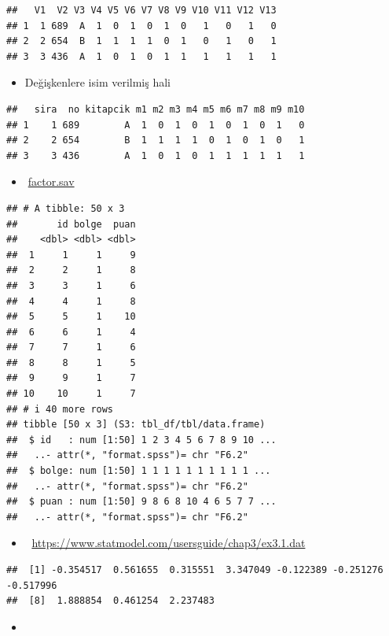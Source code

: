 \documentclass[
  oneside]{book}
\providecommand{\tightlist}{%
  \setlength{\itemsep}{0pt}\setlength{\parskip}{0pt}}
\begin{document}
\begin{verbatim}
##   V1  V2 V3 V4 V5 V6 V7 V8 V9 V10 V11 V12 V13
## 1  1 689  A  1  0  1  0  1  0   1   0   1   0
## 2  2 654  B  1  1  1  1  0  1   0   1   0   1
## 3  3 436  A  1  0  1  0  1  1   1   1   1   1
\end{verbatim}

\begin{itemize}
\tightlist
\item
  Değişkenlere isim verilmiş hali
\end{itemize}

\begin{verbatim}
##   sira  no kitapcik m1 m2 m3 m4 m5 m6 m7 m8 m9 m10
## 1    1 689        A  1  0  1  0  1  0  1  0  1   0
## 2    2 654        B  1  1  1  1  0  1  0  1  0   1
## 3    3 436        A  1  0  1  0  1  1  1  1  1   1
\end{verbatim}

\begin{itemize}
\tightlist
\item
  🔗\href{import/factor.sav}{factor.sav}
\end{itemize}

\begin{verbatim}
## # A tibble: 50 x 3
##       id bolge  puan
##    <dbl> <dbl> <dbl>
##  1     1     1     9
##  2     2     1     8
##  3     3     1     6
##  4     4     1     8
##  5     5     1    10
##  6     6     1     4
##  7     7     1     6
##  8     8     1     5
##  9     9     1     7
## 10    10     1     7
## # i 40 more rows
## tibble [50 x 3] (S3: tbl_df/tbl/data.frame)
##  $ id   : num [1:50] 1 2 3 4 5 6 7 8 9 10 ...
##   ..- attr(*, "format.spss")= chr "F6.2"
##  $ bolge: num [1:50] 1 1 1 1 1 1 1 1 1 1 ...
##   ..- attr(*, "format.spss")= chr "F6.2"
##  $ puan : num [1:50] 9 8 6 8 10 4 6 5 7 7 ...
##   ..- attr(*, "format.spss")= chr "F6.2"
\end{verbatim}

\begin{itemize}
\tightlist
\item
  🔗 \url{https://www.statmodel.com/usersguide/chap3/ex3.1.dat}
\end{itemize}

\begin{verbatim}
##  [1] -0.354517  0.561655  0.315551  3.347049 -0.122389 -0.251276 -0.517996
##  [8]  1.888854  0.461254  2.237483
\end{verbatim}

\begin{itemize}
\tightlist
\item
\end{itemize}
\end{document}
